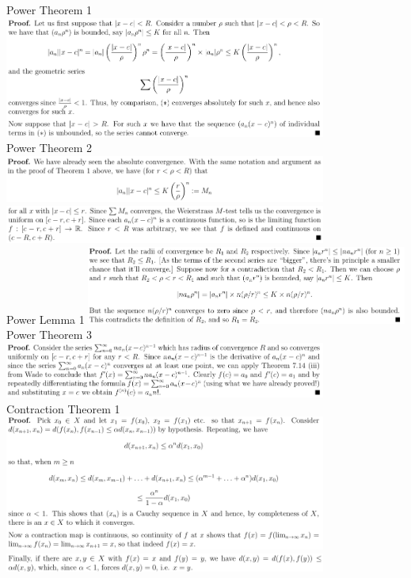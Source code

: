 \documentclass[8pt,landscape]{article}
\begin{document}
\begin{multicols}{2}
    Power Theorem 1
    \includegraphics[width=400]{P_t1.png} \\
    Power Theorem 2
    \includegraphics[width=400]{P_t2a.png} \\
    \includegraphics[width=400]{P_t2b.png} \\
    Power Lemma 1
    \includegraphics[width=400]{P_l1.png} \\
    Power Theorem 3
    \includegraphics[width=400]{P_t3.png} \\

    Contraction Theorem 1
    \includegraphics[width=400]{B_t1a.png} \\
    \includegraphics[width=400]{B_t1b.png} \\
\end{multicols}
\end{document}
